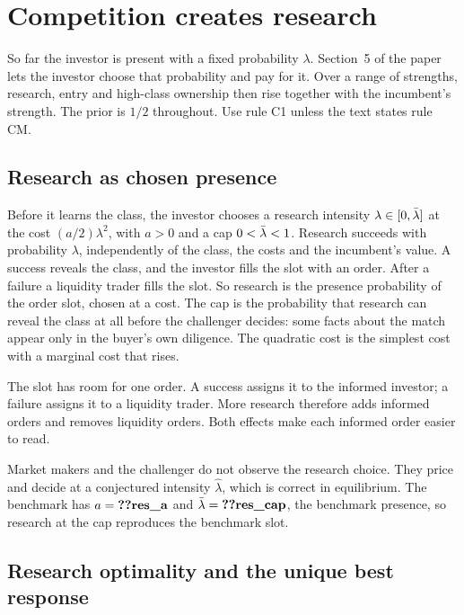 \section{Competition creates research}\label{sec:09_research}

So far the investor is present with a fixed probability \(\lambda\). Section~5 of the paper lets the investor choose
that probability and pay for it. Over a range of strengths, research, entry and high-class ownership then rise together
with the incumbent's strength. The prior is \(1/2\) throughout.
Use rule C1 unless the text states rule CM.

\subsection{Research as chosen presence}\label{sec:09_research-setup}

Before it learns the class, the investor chooses a research intensity \(\lambda\in[0,\bar\lambda]\) at the cost
\((a/2)\lambda^2\), with \(a>0\) and a cap \(0<\bar\lambda<1\). Research succeeds with probability \(\lambda\), independently of
the class, the costs and the incumbent's value. A success reveals the class, and the investor fills the slot with an
order. After a failure a liquidity trader fills the slot. So research is the presence probability of the order slot,
chosen at a cost. The cap is the probability that research can reveal the class at all before the challenger decides:
some facts about the match appear only in the buyer's own diligence. The quadratic cost is the simplest cost with a
marginal cost that rises.

\begin{intuition}
The slot has room for one order. A success assigns it to the informed investor; a failure assigns it to a liquidity trader.
More research therefore adds informed orders and removes liquidity orders. Both effects make each informed order easier to read.
\end{intuition}

Market makers and the challenger do not observe the research choice. They price and decide at a conjectured intensity
\(\hat\lambda\), which is correct in equilibrium. The benchmark has \(a=\reg{res_a}\) and \(\lb=\reg{res_cap}\), the
benchmark presence, so research at the cap reproduces the benchmark slot.

\subsection{Research optimality and the unique best response}\label{sec:09_research-optimality}

